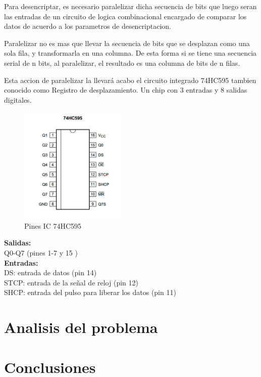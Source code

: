 \documentclass{article}
\begin{document}
Para desencriptar, es necesario paralelizar dicha secuencia de bits que luego seran las entradas de un circuito de logica combinacional encargado de comparar los datos de acuerdo a los parametros de desencriptacion.

Paralelizar no es mas que llevar la secuencia de bits que se desplazan como una sola fila, y transformarla en una columna. De esta forma si se tiene una secuencia serial de n bits, al paralelizar, el resultado es una columna de bits de n filas.

Esta accion de paralelizar la llevará acabo el circuito integrado 74HC595 tambien conocido como Registro de desplazamiento. Un chip con 3 entradas y 8 salidas digitales.

\begin{figure}[!ht]
\includegraphics[width=5cm]{74HC595.jpg}
\centering
\caption{Pines IC 74HC595}
\end{figure}

\noindent\textbf{Salidas:}\\ 
\indent Q0-Q7 (pines 1-7 y 15 )\\
\textbf{Entradas:}\\
\indent DS: entrada de datos (pin 14)\\
\indent STCP: entrada de la señal de reloj (pin 12)\\
\indent SHCP: entrada del pulso para liberar los datos (pin 11)


\section{Analisis del problema} \label{analisis}



\section{Conclusiones} \label{conclusiones}




\end{document}
